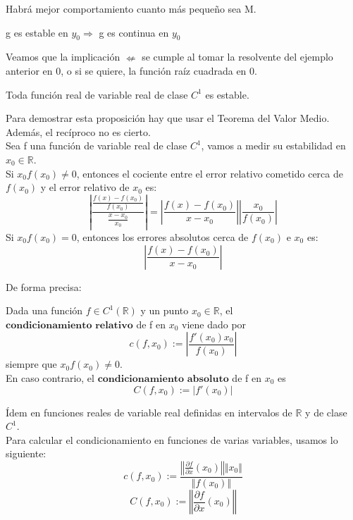 Habrá mejor comportamiento cuanto más pequeño sea M.

\begin{nprop}
g es estable en $y_0 \Rightarrow$ g es continua en $y_0$ 
\end{nprop}

Veamos que la implicación $\nLeftarrow$ se cumple al tomar la resolvente del ejemplo anterior en 0, o si se quiere, la función raíz cuadrada en 0.\\

\begin{nprop}
Toda función real de variable real de clase $C^1$ es estable.
\end{nprop}

Para demostrar esta proposición hay que usar el Teorema del Valor Medio. Además, el recíproco no es cierto.\\
Sea f una función de variable real de clase $C^1$, vamos a medir su estabilidad en $x_0 \in \mathbb{R}$.\\
Si $x_0f(x_0) \neq 0$, entonces el cociente entre el error relativo cometido cerca de $f(x_0)$ y el error relativo de $x_0$ es:
\[ \left\vert \frac{\frac{f(x) - f(x_0)}{f(x_0)}}{\frac{x - x_0}{x_0}} \right\vert = \left\vert \frac{f(x) - f(x_0)}{x - x_0} \right\vert \left\vert \frac{x_0}{f(x_0)} \right\vert \]
Si $x_0f(x_0) = 0$, entonces los errores absolutos cerca de $f(x_0)$ e $x_0$ es:
\[ \left\vert \frac{f(x) - f(x_0)}{x - x_0} \right\vert \]

De forma precisa:

\begin{ndef}
Dada una función $f \in C^1(\mathbb{R})$ y un punto $x_0 \in \mathbb{R}$, el $\textbf{condicionamiento relativo}$ de f en $x_0$ viene dado por
\[ c(f, x_0) := \left\vert \frac{f'(x_0)x_0}{f(x_0)} \right\vert \]
siempre que $x_0f(x_0) \neq 0$.\\
En caso contrario, el $\textbf{condicionamiento absoluto}$ de f en $x_0$ es
\[ C(f, x_0) := \vert f'(x_0) \vert \]
\end{ndef}

Ídem en funciones reales de variable real definidas en intervalos de $\mathbb{R}$ y de clase $C^1$.\\
Para calcular el condicionamiento en funciones de varias variables, usamos lo siguiente:
\[ c(f,x_0) := \frac{\left\Vert \frac{\partial f}{\partial x} (x_0) \right\Vert \Vert x_0 \Vert}{\Vert f(x_0) \Vert} \]
\[ C(f,x_0) := \left\Vert \frac{\partial f}{\partial x} (x_0) \right\Vert \]

